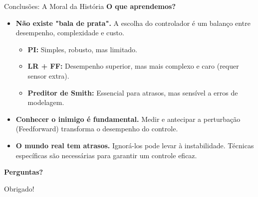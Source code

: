 \documentclass{beamer}
\begin{document}
\begin{frame}{Conclusões: A Moral da História}
    \huge \textbf{O que aprendemos?}
    
    \vspace{1.5em}
    
    \begin{itemize}
        \item<1-> \large \textbf{Não existe "bala de prata".} A escolha do controlador é um balanço entre desempenho, complexidade e custo.
        \begin{itemize}
            \item \textbf{PI:} Simples, robusto, mas limitado.
            \item \textbf{LR + FF:} Desempenho superior, mas mais complexo e caro (requer sensor extra).
            \item \textbf{Preditor de Smith:} Essencial para atrasos, mas sensível a erros de modelagem.
        \end{itemize}
        
        \item<2-> \large \textbf{Conhecer o inimigo é fundamental.} Medir e antecipar a perturbação (Feedforward) transforma o desempenho do controle.
        
        \item<3-> \large \textbf{O mundo real tem atrasos.} Ignorá-los pode levar à instabilidade. Técnicas específicas são necessárias para garantir um controle eficaz.
    \end{itemize}
\end{frame}

\begin{frame}
    \centering
    \Huge\bfseries Perguntas?
    \vspace{2em}
    
    \large Obrigado!
\end{frame}
\end{document}
